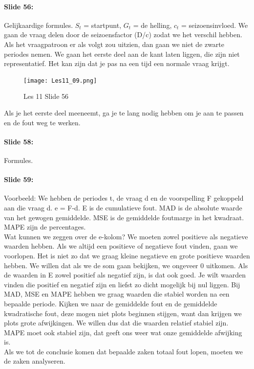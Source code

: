\documentclass[10pt,a4paper]{report}
\begin{document}
\paragraph{Slide 56:} Gelijkaardige formules. $S_{t}$ = startpunt, $G_{t}$ = de helling, $c_{t}$ = seizoensinvloed. We gaan de vraag delen door de seizoensfactor (D/c) zodat we het verschil hebben.\\
Als het vraagpatroon er als volgt zou uitzien, dan gaan we niet de zwarte periodes nemen. We gaan het eerste deel aan de kant laten liggen, die zijn niet representatief. Het kan zijn dat je pas na een tijd een normale vraag krijgt. \\

\begin{figure}[h!]
\centering
\texttt{[image: Les11\_09.png]}
\caption{Les 11 Slide 56} 
\label{les11_09}
\end{figure}

Als je het eerste deel meeneemt, ga je te lang nodig hebben om je aan te passen en de fout weg te werken.

\paragraph{Slide 58:} Formules.

\paragraph{Slide 59:} Voorbeeld: We hebben de periodes t, de vraag d en de voorspelling F gekoppeld aan die vraag d. e = F-d. E is de cumulatieve fout. MAD is de absolute waarde van het gewogen gemiddelde. MSE is de gemiddelde foutmarge in het kwadraat. MAPE zijn de percentages.\\
Wat kunnen we zeggen over de e-kolom? We moeten zowel positieve als negatieve waarden hebben. Als we altijd een positieve of negatieve fout vinden, gaan we voorlopen. Het is niet zo dat we graag kleine negatieve en grote positieve waarden hebben. We willen dat als we de som gaan bekijken, we ongeveer 0 uitkomen. Als de waarden in E zowel positief als negatief zijn, is dat ook goed. Je wilt waarden vinden die positief en negatief zijn en liefst zo dicht mogelijk bij nul liggen. Bij MAD, MSE en MAPE hebben we graag waarden die stabiel worden na een bepaalde periode. Kijken we naar de gemiddelde fout en de gemiddelde kwadratische fout, deze mogen niet plots beginnen stijgen, want dan krijgen we plots grote afwijkingen. We willen dus dat die waarden relatief stabiel zijn. MAPE moet ook stabiel zijn, dat geeft ons weer wat onze gemiddelde afwijking is.\\
Als we tot de conclusie komen dat bepaalde zaken totaal fout lopen, moeten we de zaken analyseren.
\end{document}
